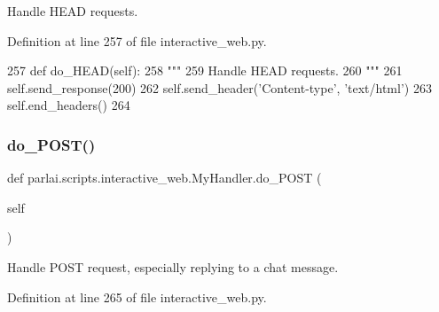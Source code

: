 \begin{DoxyVerb}Handle HEAD requests.
\end{DoxyVerb}
 

Definition at line 257 of file interactive\+\_\+web.\+py.


\begin{DoxyCode}
257     \textcolor{keyword}{def }do\_HEAD(self):
258         \textcolor{stringliteral}{"""}
259 \textcolor{stringliteral}{        Handle HEAD requests.}
260 \textcolor{stringliteral}{        """}
261         self.send\_response(200)
262         self.send\_header(\textcolor{stringliteral}{'Content-type'}, \textcolor{stringliteral}{'text/html'})
263         self.end\_headers()
264 
\end{DoxyCode}
\mbox{\label{classparlai_1_1scripts_1_1interactive__web_1_1MyHandler_abea6bbf8b4439489c05a388fa615506c}} 
\subsubsection{\texorpdfstring{do\+\_\+\+P\+O\+S\+T()}{do\_POST()}}
{\footnotesize\ttfamily def parlai.\+scripts.\+interactive\+\_\+web.\+My\+Handler.\+do\+\_\+\+P\+O\+ST (\begin{DoxyParamCaption}\item[{}]{self }\end{DoxyParamCaption})}

\begin{DoxyVerb}Handle POST request, especially replying to a chat message.
\end{DoxyVerb}
 

Definition at line 265 of file interactive\+\_\+web.\+py.


